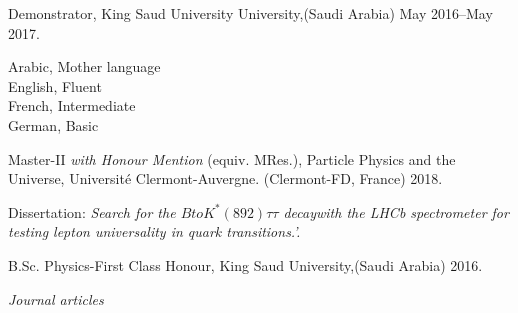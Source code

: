 \documentclass[11pt,article,oneside]{memoir}
\begin{document}
\ind  Demonstrator, King Saud University University,(Saudi Arabia)  May 2016--May 2017.

\bigskip

 \ind Arabic, Mother language\\
  \ind English, Fluent\\
 \ind French, Intermediate\\
 \ind German, Basic\\
 \bigskip



\ind Master-II  \textit{with Honour Mention} (equiv. MRes.), Particle Physics and the Universe, Université Clermont-Auvergne. (Clermont-FD, France) 2018.

\ind \hspace{0.35in} \footnotesize Dissertation: \emph{Search for the $B to K^*( 892) \tau \tau$ decaywith the LHCb spectrometer for testing	lepton universality in quark transitions.’.\normalsize \vspace{0.05in}}

\ind B.Sc. Physics-First Class Honour, King Saud University,(Saudi Arabia) 2016.

\bigskip
 
\medskip


\vspace{-0.075in}

\normalsize

\bigskip
\noindent\emph{Journal articles \vspace{0.05in}}
 
\end{document}
